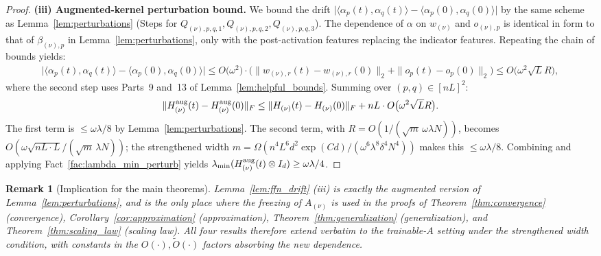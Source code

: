 \documentclass[11pt]{article}
\theoremstyle{plain}
\newtheorem{remark}[theorem]{Remark}
\begin{document}
\begin{proof}
    \textbf{(iii) Augmented-kernel perturbation bound.} We bound the drift $\big|\langle\alpha_p(t),\alpha_q(t)\rangle - \langle\alpha_p(0),\alpha_q(0)\rangle\big|$ by the same scheme as Lemma~\ref{lem:perturbations} (Steps for $Q_{(\nu),p,q,1}, Q_{(\nu),p,q,2}, Q_{(\nu),p,q,3}$). The dependence of $\alpha$ on $w_{(\nu)}$ and $o_{(\nu),p}$ is identical in form to that of $\beta_{(\nu),p}$ in Lemma~\ref{lem:perturbations}, only with the post-activation features replacing the indicator features. Repeating the chain of bounds yields:
    \begin{align*}
        \big|\langle\alpha_p(t),\alpha_q(t)\rangle - \langle\alpha_p(0),\alpha_q(0)\rangle\big| \leq O\big(\omega^2\big)\cdot \big( \|w_{(\nu),r}(t) - w_{(\nu),r}(0)\|_2 + \|o_p(t) - o_p(0)\|_2 \big) \leq O\big(\omega^2 \sqrt L R\big),
    \end{align*}
    where the second step uses Parts~9 and~13 of Lemma~\ref{lem:helpful_bounds}. Summing over $(p,q)\in[nL]^2$:
    \begin{align*}
        \|H_{(\nu)}^{\rm aug}(t) - H_{(\nu)}^{\rm aug}(0)\|_F \leq \|H_{(\nu)}(t)-H_{(\nu)}(0)\|_F + nL\cdot O\big(\omega^2 \sqrt L R\big).
    \end{align*}
    The first term is $\le \omega\lambda/8$ by Lemma~\ref{lem:perturbations}. The second term, with $R = O(1/(\sqrt m\,\omega\lambda N))$, becomes $O(\omega\sqrt{nL\cdot L}/(\sqrt m\,\lambda N))$; the strengthened width $m = \Omega(n^4 L^6 d^2 \exp(Cd)/(\omega^6\lambda^8\delta^4 N^4))$ makes this $\le \omega\lambda/8$. Combining and applying Fact~\ref{fac:lambda_min_perturb} yields $\lambda_{\min}(H_{(\nu)}^{\rm aug}(t)\otimes I_d)\ge \omega\lambda/4$.
\end{proof}

\begin{remark}[Implication for the main theorems]\label{rem:trainable_ffn_main}
    Lemma~\ref{lem:ffn_drift} (iii) is exactly the augmented version of Lemma~\ref{lem:perturbations}, and is the only place where the freezing of $A_{(\nu)}$ is used in the proofs of Theorem~\ref{thm:convergence} (convergence), Corollary~\ref{cor:approximation} (approximation), Theorem~\ref{thm:generalization} (generalization), and Theorem~\ref{thm:scaling_law} (scaling law). All four results therefore extend verbatim to the trainable-$A$ setting under the strengthened width condition, with constants in the $O(\cdot), \widetilde O(\cdot)$ factors absorbing the new dependence.
\end{remark}
\end{document}
